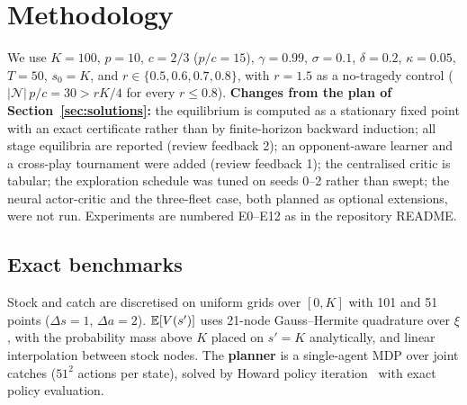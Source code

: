 \section{Methodology}
\label{sec:method}
We use $K=100$, $p=10$, $c=2/3$ ($p/c=15$), $\gamma=0.99$, $\sigma=0.1$, $\delta=0.2$, $\kappa=0.05$, $T=50$, $s_0=K$,
and $r\in\{0.5,0.6,0.7,0.8\}$, with $r=1.5$ as a no-tragedy control ($|\mathcal N|\,p/c=30>rK/4$ for every $r\le0.8$).
\textbf{Changes from the plan of Section~\ref{sec:solutions}:} the equilibrium is computed as a stationary fixed point
with an exact certificate rather than by finite-horizon backward induction; all stage equilibria are reported (review
feedback 2); an opponent-aware learner and a cross-play tournament were added (review feedback 1); the centralised critic
is tabular; the exploration schedule was tuned on seeds 0--2 rather than swept; the neural actor-critic and the
three-fleet case, both planned as optional extensions, were not run. Experiments are numbered E0--E12 as in the
repository README.

\subsection{Exact benchmarks}
Stock and catch are discretised on uniform grids over $[0,K]$ with 101 and 51 points ($\Delta s=1$, $\Delta a=2$).
$\mathbb{E}[V(s')]$ uses 21-node Gauss--Hermite quadrature over $\xi$, with the probability mass above $K$ placed on $s'=K$
analytically, and linear interpolation between stock nodes. The \textbf{planner} is a single-agent MDP over joint catches
($51^2$ actions per state), solved by Howard policy iteration~\cite{howard1960} with exact policy evaluation.

